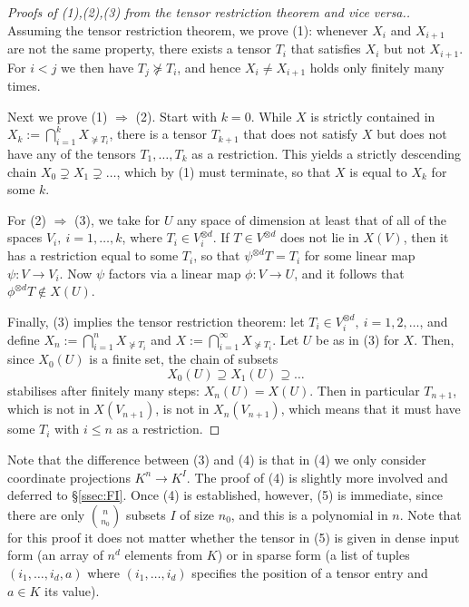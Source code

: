 \documentclass{amsart}
\begin{document}
\begin{proof}[Proofs of (1),(2),(3) from the tensor
restriction theorem and vice versa.]

Assuming the tensor restriction theorem, we prove (1): whenever $X_i$
and $X_{i+1}$ are not the same property, there exists a tensor $T_i$
that satisfies $X_i$ but not $X_{i+1}$. For $i<j$ we then have $T_j \not
\succeq T_i$, and hence $X_i \neq X_{i+1}$ holds only finitely many times.

Next we prove (1) $\Rightarrow$ (2). Start with $k=0$. While $X$ is
strictly contained in $X_k:=\bigcap_{i=1}^k X_{\not \succeq T_i}$, there
is a tensor $T_{k+1}$ that does not satisfy $X$ but does not have any of
the tensors $T_1,\ldots,T_k$ as a restriction. This yields a strictly
descending chain $X_0 \supsetneq X_1 \supsetneq \ldots$, which by (1)
must terminate, so that $X$ is equal to $X_k$ for some $k$.

For (2) $\Rightarrow$ (3), we take for $U$ any space of dimension at
least that of all of the spaces $V_i,\ i=1,\ldots,k$, where $T_i \in
V_i^{\otimes d}$. If $T \in V^{\otimes d}$ does not lie in
$X(V)$, then it has a restriction equal to some
$T_i$, so that $\psi^{\otimes d} T=T_i$ for some linear map $\psi:V \to
V_i$. Now $\psi$ factors
via a linear map $\phi:V \to U$, and it follows that $\phi^{\otimes d}
T \not \in X(U)$.

Finally, (3) implies the tensor restriction theorem: let $T_i \in
V_i^{\otimes d},\ i=1,2,\ldots$, and define $X_n:=\bigcap_{i=1}^n
X_{\not \succeq T_i}$ and $X:=\bigcap_{i=1}^\infty X_{\not \succeq T_i}$.
Let $U$ be as in (3) for $X$. Then, since $X_0(U)$ is a finite set, the
chain of subsets
\[ X_0(U) \supseteq X_1(U) \supseteq \ldots \]
stabilises after finitely many steps: $X_n(U)=X(U)$. Then in particular
$T_{n+1}$, which is not in $X(V_{n+1})$, is not in $X_n(V_{n+1})$,
which means that it must have some $T_i$ with $i \leq n$ as a restriction.
\end{proof}

Note that the difference between (3) and (4) is that in (4) we only
consider coordinate projections $K^n \to K^I$. The proof of (4) is
slightly more involved and deferred to \S\ref{ssec:FI}. Once (4) is established,
however, (5) is immediate, since there are only $\binom{n}{n_0}$ subsets
$I$ of size $n_0$, and this is a polynomial in $n$. Note that for this
proof it does not matter whether the tensor in (5) is given in dense
input form (an array of $n^d$ elements from $K$) or in sparse form (a
list of tuples $(i_1,\ldots,i_d,a)$ where $(i_1,\ldots,i_d)$ specifies
the position of a tensor entry and $a \in K$ its value).
\end{document}
